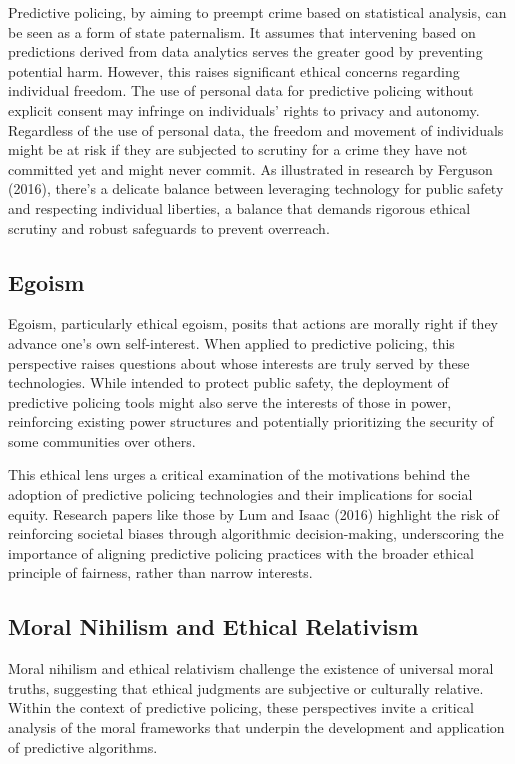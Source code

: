 \documentclass[man, noextraspace]{apa7} %
\begin{document}
Predictive policing, by aiming to preempt crime based on statistical analysis, can be seen as a form of state paternalism. It assumes that intervening based on predictions derived from data analytics serves the greater good by preventing potential harm. However, this raises significant ethical concerns regarding individual freedom. The use of personal data for predictive policing without explicit consent may infringe on individuals' rights to privacy and autonomy. Regardless of the use of personal data, the freedom and movement of individuals might be at risk if they are subjected to scrutiny for a crime they have not committed yet and might never commit. As illustrated in research by Ferguson (2016), there's a delicate balance between leveraging technology for public safety and respecting individual liberties, a balance that demands rigorous ethical scrutiny and robust safeguards to prevent overreach.

\subsection{Egoism}
Egoism, particularly ethical egoism, posits that actions are morally right if they advance one's own self-interest. When applied to predictive policing, this perspective raises questions about whose interests are truly served by these technologies. While intended to protect public safety, the deployment of predictive policing tools might also serve the interests of those in power, reinforcing existing power structures and potentially prioritizing the security of some communities over others.

This ethical lens urges a critical examination of the motivations behind the adoption of predictive policing technologies and their implications for social equity. Research papers like those by Lum and Isaac (2016) highlight the risk of reinforcing societal biases through algorithmic decision-making, underscoring the importance of aligning predictive policing practices with the broader ethical principle of fairness, rather than narrow interests.

\subsection{Moral Nihilism and Ethical Relativism}
Moral nihilism and ethical relativism challenge the existence of universal moral truths, suggesting that ethical judgments are subjective or culturally relative. Within the context of predictive policing, these perspectives invite a critical analysis of the moral frameworks that underpin the development and application of predictive algorithms.
\end{document}

